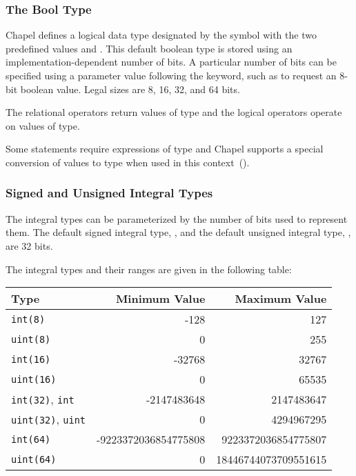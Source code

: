 \subsubsection{The Bool Type}
\label{The_Bool_Type}

Chapel defines a logical data type designated by the symbol
 with the two predefined values  and
.  This default boolean type is stored using an
implementation-dependent number of bits.  A particular number of bits
can be specified using a parameter value following the 
keyword, such as  to request an 8-bit boolean value.
Legal sizes are 8, 16, 32, and 64 bits.

The relational operators return values of  type and the
logical operators operate on values of  type.

Some statements require expressions of  type and Chapel
supports a special conversion of values to  type when used
in this context~().

\subsubsection{Signed and Unsigned Integral Types}
\label{Signed_and_Unsigned_Integral_Types}

The integral types can be parameterized by the number of bits used to
represent them.  The default signed integral type, , and the
default unsigned integral type, , are 32 bits.

The integral types and their ranges are given in the following table:

\begin{center}
\begin{tabular}{|l|r|r|}
\hline
{\bf Type} & {\bf Minimum Value} & {\bf Maximum Value} \\
\hline
{\tt int(8)} & -128 & 127 \\
{\tt uint(8)} & 0 & 255 \\
{\tt int(16)} & -32768 & 32767 \\
{\tt uint(16)} & 0 & 65535 \\
{\tt int(32)}, {\tt int} & -2147483648 & 2147483647 \\
{\tt uint(32)}, {\tt uint} & 0 & 4294967295 \\
{\tt int(64)} & -9223372036854775808 & 9223372036854775807 \\
{\tt uint(64)} & 0 & 18446744073709551615 \\
\hline
\end{tabular}
\end{center}

